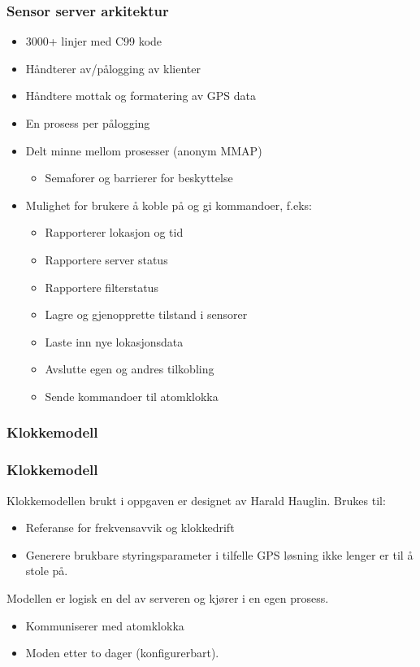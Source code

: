 \documentclass[xcolor=table]{beamer}
\begin{document}
\begin{frame}
  \frametitle{Sensor server arkitektur}
  \begin{itemize}
    \item 3000+ linjer med C99 kode
    \item Håndterer av/pålogging av klienter
    \item Håndtere mottak og formatering av GPS data
    \item En prosess per pålogging
    \item Delt minne mellom prosesser (anonym MMAP)
      \begin{itemize}
        \item Semaforer og barrierer for beskyttelse
      \end{itemize}
    \item Mulighet for brukere å koble på og gi kommandoer, f.eks:
      \begin{itemize}
        \item Rapporterer lokasjon og tid
        \item Rapportere server status
        \item Rapportere filterstatus
        \item Lagre og gjenopprette tilstand i sensorer
        \item Laste inn nye lokasjonsdata
        \item Avslutte egen og andres tilkobling
        \item Sende kommandoer til atomklokka 
      \end{itemize}
  \end{itemize}
\end{frame}

\subsubsection{Klokkemodell}
\begin{frame}
  \frametitle{Klokkemodell}
    Klokkemodellen brukt i oppgaven er designet av Harald Hauglin. Brukes til:
    \begin{itemize}
      \item Referanse for frekvensavvik og klokkedrift 
      \item Generere brukbare styringsparameter i tilfelle GPS løsning ikke lenger er til å stole på.
    \end{itemize}
    Modellen er logisk en del av serveren og kjører i en egen prosess.
    \begin{itemize}
      \item Kommuniserer med atomklokka
      \item Moden etter to dager (konfigurerbart).
    \end{itemize}
\end{frame}
\end{document}
